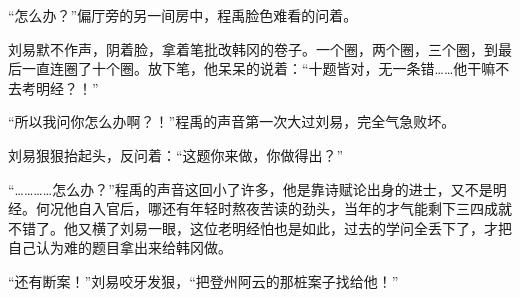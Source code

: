 “怎么办？”偏厅旁的另一间房中，程禹脸色难看的问着。

刘易默不作声，阴着脸，拿着笔批改韩冈的卷子。一个圈，两个圈，三个圈，到最后一直连圈了十个圈。放下笔，他呆呆的说着：“十题皆对，无一条错……他干嘛不去考明经？！”

“所以我问你怎么办啊？！”程禹的声音第一次大过刘易，完全气急败坏。

刘易狠狠抬起头，反问着：“这题你来做，你做得出？”

“…………怎么办？”程禹的声音这回小了许多，他是靠诗赋论出身的进士，又不是明经。何况他自入官后，哪还有年轻时熬夜苦读的劲头，当年的才气能剩下三四成就不错了。他又横了刘易一眼，这位老明经怕也是如此，过去的学问全丢下了，才把自己认为难的题目拿出来给韩冈做。

“还有断案！”刘易咬牙发狠，“把登州阿云的那桩案子找给他！”

